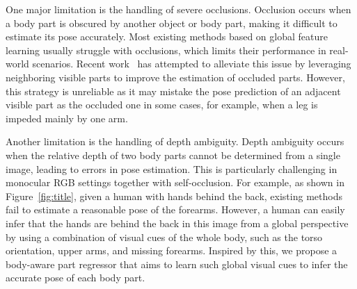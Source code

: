 \documentclass[10pt,twocolumn,letterpaper]{article}
\begin{document}
One major limitation is the handling of severe occlusions. Occlusion occurs when a body part is obscured by another object or body part, making it difficult to estimate its pose accurately. Most existing methods based on global feature learning usually struggle with occlusions, which limits their performance in real-world scenarios. Recent work~\cite{kocabas2021pare} has attempted to alleviate this issue by leveraging neighboring visible parts to improve the estimation of occluded parts. However, this strategy is unreliable as it may mistake the pose prediction of an adjacent visible part as the occluded one in some cases, for example, when a leg is impeded mainly by one arm.

Another limitation is the handling of depth ambiguity. Depth ambiguity occurs when the relative depth of two body parts cannot be determined from a single image, leading to errors in pose estimation. This is particularly challenging in monocular RGB settings together with self-occlusion. For example, as shown in Figure~\ref{fig:title}, given a human with hands behind the back, existing methods fail to estimate a reasonable pose of the forearms. However, a human can easily infer that the hands are behind the back in this image from a global perspective by using a combination of visual cues of the whole body, such as the torso orientation, upper arms, and missing forearms. Inspired by this, we propose a body-aware part regressor that aims to learn such global visual cues to infer the accurate pose of each body part.
\end{document}
